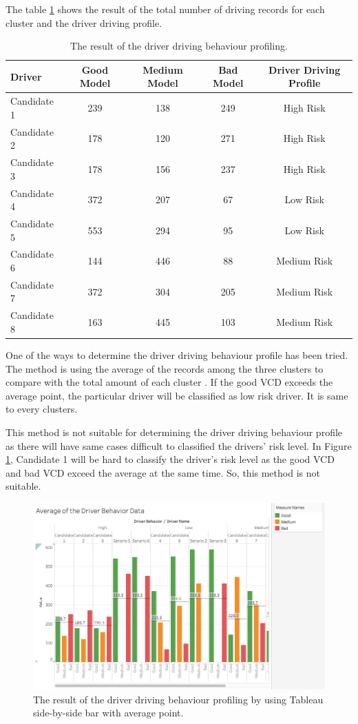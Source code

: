 The table \ref{tbl:result} shows the result of the total number of driving records for each cluster and the driver driving profile.

\begin{table}[h!]
\begin{tabular}{|l|c|c|c|c|}
\hline
Driver & Good Model & Medium Model & Bad Model & Driver Driving Profile \\

\hline
Candidate 1 & 239 & 138 & 249 & High Risk\\

\hline
Candidate 2 & 178 & 120 & 271 & High Risk\\
  
\hline
Candidate 3 & 178 & 156 & 237 & High Risk\\

\hline
Candidate 4 & 372 & 207 & 67 & Low Risk\\

\hline
Candidate 5 & 553 & 294 & 95 & Low Risk\\

\hline
Candidate 6 & 144 & 446 & 88 & Medium Risk\\

\hline
Candidate 7 & 372 & 304 & 205 & Medium Risk\\

\hline
Candidate 8 & 163 & 445 & 103 & Medium Risk\\

\hline
\end{tabular}
\label{tbl:result}
\caption{The result of the driver driving behaviour profiling.}    
\end{table}

One of the ways to determine the driver driving behaviour profile has been tried. The method is using the average of the records among the three clusters to compare with the total amount of each cluster . If the good VCD exceeds the average point, the particular driver will be classified as low risk driver. It is same to every clusters.

This method is not suitable for determining the driver driving behaviour profile as there will have same cases difficult to classified the drivers' risk level. In Figure \ref{fig:Tresult}, Candidate 1 will be hard to classify the driver's risk level as the good VCD and bad VCD exceed the average at the same time. So, this method is not suitable.
 
\begin{figure}[hbt!]\centering
\includegraphics[width=.75\textwidth]{image/Tresult}
\caption{The result of the driver driving behaviour profiling by using Tableau side-by-side bar with average point.}
\label{fig:Tresult}
\end{figure} 